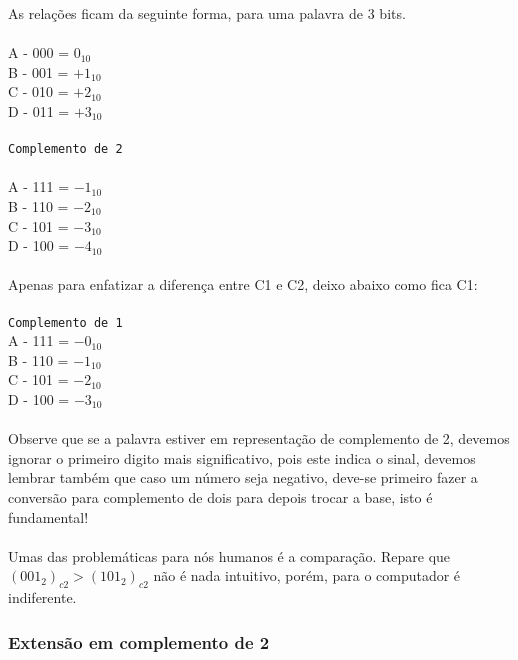\documentclass[12pt, onecolumn]{article}
\begin{document}
	As relações ficam da seguinte forma, para uma palavra de 3 bits.\\
	\\
	A - 000 = $0_{10}$\\
	B - 001 = $+1_{10}$\\
	C - 010 = $+2_{10}$\\
	D - 011 = $+3_{10}$\\
	\\
	\texttt{Complemento de 2}\\
	\\
	A - 111 = $-1_{10}$\\
	B - 110 = $-2_{10}$\\
	C - 101 = $-3_{10}$\\
	D - 100 = $-4_{10}$\\
	\\
	Apenas para enfatizar a diferença entre C1 e C2, deixo
	abaixo como fica C1:\\
	\\
	\texttt{Complemento de 1}\\
	A - 111 = $-0_{10}$\\
	B - 110 = $-1_{10}$\\ 	
	C - 101 = $-2_{10}$\\ 	
	D - 100 = $-3_{10}$\\
	\\
	Observe que se a palavra estiver em representação de 
	complemento de 2, devemos ignorar o primeiro digito
	mais significativo, pois este indica o sinal,
	devemos lembrar também que caso um número seja
	negativo, deve-se primeiro fazer a conversão 
	para complemento de dois para depois trocar a base, 
	isto é fundamental!\\
	\\
	Umas das problemáticas para nós humanos é a comparação.
	Repare que $(001_2)_{c2} > (101_2)_{c2}$ não é nada
	intuitivo, porém, para o computador é indiferente.
	
		\subsubsection{\centering Extensão em complemento de 2}
	
\end{document}

